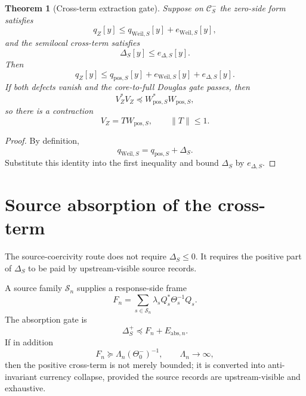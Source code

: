\documentclass[11pt]{article}
\newtheorem{theorem}{Theorem}
\newcommand{\CS}{\mathcal C}
\newcommand{\Pos}{\mathrm{pos}}
\newcommand{\Weil}{\mathrm{Weil}}
\begin{document}
\begin{theorem}[Cross-term extraction gate]
Suppose on $\CS_S^-$ the zero-side form satisfies
\[
q_Z[y]\le q_{\Weil,S}[y]+e_{\Weil,S}[y],
\]
and the semilocal cross-term satisfies
\[
\Delta_S[y]\le e_{\Delta,S}[y].
\]
Then
\[
\boxed{
q_Z[y]\le q_{\Pos,S}[y]+e_{\Weil,S}[y]+e_{\Delta,S}[y].
}
\]
If both defects vanish and the core-to-full Douglas gate passes, then
\[
V_Z^*V_Z\preceq W_{\Pos,S}^*W_{\Pos,S},
\]
so there is a contraction
\[
V_Z=T W_{\Pos,S},
\qquad \|T\|\le1.
\]
\end{theorem}

\begin{proof}
By definition,
\[
q_{\Weil,S}=q_{\Pos,S}+\Delta_S.
\]
Substitute this identity into the first inequality and bound $\Delta_S$ by $e_{\Delta,S}$.
\end{proof}

\section{Source absorption of the cross-term}
The source-coercivity route does not require $\Delta_S\le0$.  It requires the positive part of $\Delta_S$ to be paid by upstream-visible source records.

A source family $\mathcal S_n$ supplies a response-side frame
\[
F_n=
\sum_{s\in\mathcal S_n}
\lambda_s Q_s^*\Theta_s^{-1}Q_s.
\]
The absorption gate is
\[
\boxed{
\Delta_S^+\preceq F_n+E_{\mathrm{abs},n}.
}
\]
If in addition
\[
F_n\succeq \Lambda_n(\Theta_0^-)^{-1},
\qquad
\Lambda_n\to\infty,
\]
then the positive cross-term is not merely bounded; it is converted into anti-invariant currency collapse, provided the source records are upstream-visible and exhaustive.
\end{document}
